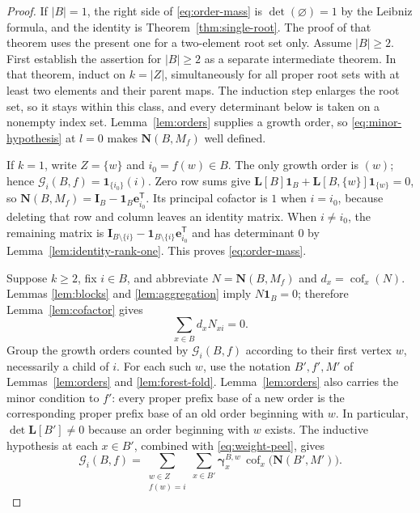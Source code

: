 \documentclass[11pt]{article}
\newcommand{\one}{\mathbf 1}
\newcommand{\Id}{\mathbf I}
\newcommand{\Lmat}{\mathbf L}
\newcommand{\Nmat}{\mathbf N}
\newcommand{\gam}{\boldsymbol\gamma}
\newcommand{\cof}{\operatorname{cof}}
\begin{document}
\begin{proof}
If $|B|=1$, the right side of \eqref{eq:order-mass} is
$\det(\varnothing)=1$ by the Leibniz formula, and the identity is
Theorem~\ref{thm:single-root}. The proof of that theorem uses the
present one for a two-element root set only. Assume $|B|\geq2$.
First establish the assertion for $|B|\geq2$ as a separate
intermediate theorem. In that theorem, induct on $k=|Z|$,
simultaneously for all proper root sets
with at least two elements and their parent maps. The induction
step enlarges the root set, so it stays within this class, and
every determinant below is taken on a nonempty index set.
Lemma~\ref{lem:orders} supplies a growth
order, so \eqref{eq:minor-hypothesis} at $l=0$ makes
$\Nmat(B,M_f)$ well defined.

If $k=1$, write $Z=\{w\}$ and $i_0=f(w)\in B$. The only growth
order is $(w)$; hence $\mathcal G_i(B,f)=\mathbf1_{\{i_0\}}(i)$.
Zero row sums give
$\Lmat[B]\one_B+\Lmat[B,\{w\}]\one_{\{w\}}=0$, so
$\Nmat(B,M_f)=\Id_B-\one_B\mathbf e_{i_0}^{\mathsf T}$.
Its principal cofactor is $1$ when $i=i_0$, because deleting that
row and column leaves an identity matrix. When $i\neq i_0$, the
remaining matrix is
$\Id_{B\setminus\{i\}}-\one_{B\setminus\{i\}}
\mathbf e_{i_0}^{\mathsf T}$ and has determinant $0$ by
Lemma~\ref{lem:identity-rank-one}. This proves
\eqref{eq:order-mass}.

Suppose $k\geq2$, fix $i\in B$, and abbreviate
$N=\Nmat(B,M_f)$ and $d_x=\cof_x(N)$. Lemmas
\ref{lem:blocks} and \ref{lem:aggregation} imply $N\one_B=0$;
therefore Lemma~\ref{lem:cofactor} gives
\begin{equation}\label{eq:left-kernel}
\sum_{x\in B}d_xN_{xi}=0.
\end{equation}
Group the growth orders counted by $\mathcal G_i(B,f)$ according
to their first vertex $w$, necessarily a child of $i$. For each
such $w$, use the notation $B',f',M'$ of Lemmas~\ref{lem:orders}
and \ref{lem:forest-fold}. Lemma~\ref{lem:orders} also carries the
minor condition to $f'$: every proper prefix base of a new order
is the corresponding proper prefix base of an old order beginning
with $w$. In particular, $\det\Lmat[B']\neq0$ because an order
beginning with $w$ exists. The inductive hypothesis at each
$x\in B'$, combined with \eqref{eq:weight-peel}, gives
\begin{equation}\label{eq:induction-sum}
\mathcal G_i(B,f)
=\sum_{\substack{w\in Z\\ f(w)=i}}
   \sum_{x\in B'}\gam^{B,w}_x\,
      \cof_x\bigl(\Nmat(B',M')\bigr).
\end{equation}


\end{proof}
\end{document}
